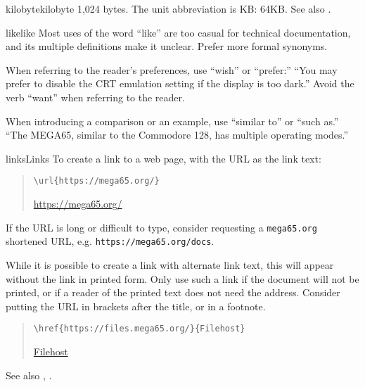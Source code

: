 \begin{sgentry}{kilobyte}{kilobyte}
    1,024 bytes. The unit abbreviation is KB: 64KB. See also .
\end{sgentry}

\begin{sgentry}{like}{like}
    Most uses of the word ``like'' are too casual for technical documentation, and its multiple definitions make it unclear. Prefer more formal synonyms.

    When referring to the reader's preferences, use ``wish'' or ``prefer:'' ``You may prefer to disable the CRT emulation setting if the display is too dark.'' Avoid the verb ``want'' when referring to the reader.

    When introducing a comparison or an example, use ``similar to'' or ``such as.'' ``The MEGA65, similar to the Commodore 128, has multiple operating modes.''
\end{sgentry}

\begin{sgentry}{links}{Links}
    To create a link to a web page, with the URL as the link text:

    \begin{quote}
        \texttt{{\textbackslash}url\{https://mega65.org/\}}

        \hrulefill

        \url{https://mega65.org/}
    \end{quote}

    If the URL is long or difficult to type, consider requesting a \texttt{mega65.org} shortened URL, e.g. \texttt{https://mega65.org/docs}.

    While it is possible to create a link with alternate link text, this will appear without the link in printed form. Only use such a link if the document will not be printed, or if a reader of the printed text does not need the address. Consider putting the URL in brackets after the title, or in a footnote.

    \begin{quote}
        \texttt{{\textbackslash}href\{https://files.mega65.org/\}\{Filehost\}}

        \hrulefill

        \href{https://files.mega65.org/}{Filehost}
    \end{quote}

    See also , .
\end{sgentry}

